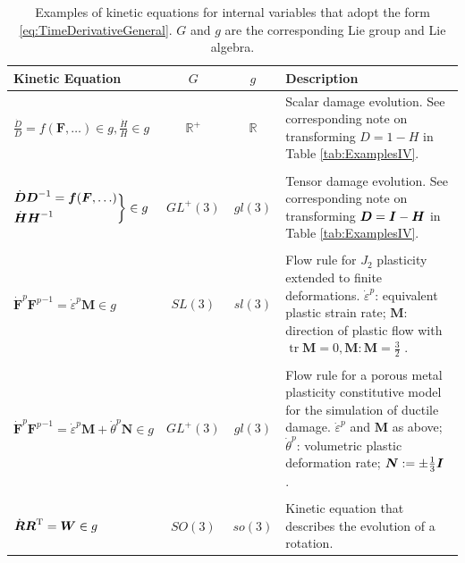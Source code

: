 \documentclass[12pt]{article}
\newcommand{\mbs}[1]{\boldsymbol{#1}}
\newcommand{\mbb}[1]{\mathbb{#1}}
\def\bD{{\mbs{D}}} \def\bE{{\mbs{E}}} \def\bF{{\mbs{F}}}
\def\bM{{\mbs{M}}} \def\bN{{\mbs{N}}} \def\bO{{\mbs{O}}}
\DeclareMathOperator{\tr}{tr}
\begin{document}
\begin{table}[htbp]
  \begin{center}
    \begin{tabular}{ l c c p{60mm} }
      \toprule
      Kinetic Equation
      &
      $G$
      &
      $g$
      &
      Description
      \\
      \hline
      $\displaystyle\frac{\dot{D}}{D} =
      f(\bF,\ldots) \in g,
      \frac{\dot{H}}{H} \in g$
      &
      $\mbb{R}^+$
      &
      $\mbb{R}$
      &
      Scalar damage evolution. See corresponding note on
      transforming $D = 1 - H$ in Table
      \ref{tab:ExamplesIV}.
      \\
      \\
      \multirow{2}{*}{$\begin{aligned}& \dot{\bD}\bD^{-1} =
          \fb(\bF,\ldots) \\
          & \dot{\bH}\bH^{-1}
        \end{aligned}\bigg\} \in g$}
      &
      $GL^+(3)$
      &
      $gl(3)$
      &
      Tensor damage evolution. See corresponding note on
      transforming $\bD = \bI - \bH$ in Table
      \ref{tab:ExamplesIV}.
      \\
      \\
      $\dot{\bF}^p {\bF^p}^{-1} = \dot{\varepsilon}^p \bM \in g$
      &
      $SL(3)$
      &
      $sl(3)$
      &
      Flow rule for $J_2$ plasticity extended to finite
      deformations. $\dot{\varepsilon}^p$: equivalent plastic strain rate;
      $\bM$: direction of plastic flow with $\tr \bM = 0, \bM:\bM =
      \frac{3}{2}$
      \citep{Ortiz.Stainier:1999}.
      \\
      \\
      $\dot{\bF}^p {\bF^p}^{-1} = \dot{\varepsilon}^p \bM +
      \dot{\theta}^p \bN \in g$
      &
      $GL^+(3)$
      &
      $gl(3)$
      &
      Flow rule for a porous metal plasticity constitutive model for
      the simulation of ductile damage. $\dot{\varepsilon}^p$ and
      $\bM$ as above; $\dot{\theta}^p$: volumetric plastic deformation rate;
      $\bN := \pm \frac{1}{3} \bI$ \citep{Weinberg.etal:2006}.
      \\
      \\
      $\dot{\bR} {\bR}^{\text{T}} = \bW \in g$
      &
      $SO(3)$
      &
      $so(3)$
      &
      Kinetic equation that describes the evolution of a rotation.
      \\
      \bottomrule
    \end{tabular}
    \caption{Examples of kinetic equations for internal variables that
      adopt the form \ref{eq:TimeDerivativeGeneral}. $G$ and $g$ are
      the corresponding Lie group and Lie algebra.}
    \label{tab:ExamplesEvolution}
  \end{center}
\end{table}
\end{document}
